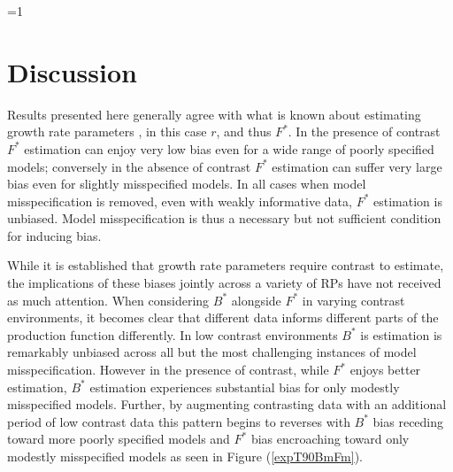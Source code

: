\documentclass[12pt]{article}
\newcounter{alphasect}
\def\alphainsection{0}
\let\oldsection=\section
\def\section{%
  \ifnum\alphainsection=1%
    \addtocounter{alphasect}{1}
  \fi%
\oldsection}%
\begin{document}
\clearpage
\section{Discussion\label{dis}}

%
Results presented here generally agree with what is known about estimating 
growth rate parameters , 
in this case $r$, and thus $F^*$.  
In the presence of contrast $F^*$ estimation can enjoy very low bias even 
for a wide range of poorly specified models; conversely in the absence of 
contrast $F^*$ estimation can suffer very large bias even for slightly 
misspecified models. In all cases when model misspecification is removed, even 
with weakly informative data, $F^*$ estimation is unbiased.  Model 
misspecification is thus a necessary but not sufficient condition for inducing 
bias. 



While it is established that growth rate parameters require contrast to estimate, 
the implications of these biases jointly across a variety of RPs have not 
received as much attention. 
When considering $B^*$ alongside $F^*$ in varying contrast environments, it 
becomes clear that different data informs different parts of the production 
function differently. In low contrast environments $B^*$ is estimation is 
remarkably unbiased across all but the most challenging instances of model 
misspecification. However in the presence of contrast, while $F^*$ enjoys 
better estimation, $B^*$ estimation experiences substantial bias for only 
modestly misspecified models. Further, by augmenting contrasting data with an 
additional period of low contrast data this pattern begins to reverses with $B^*$ 
bias receding toward more poorly specified models and $F^*$ bias encroaching 
toward only modestly misspecified models as seen in Figure (\ref{expT90BmFm}).   
\end{document}
